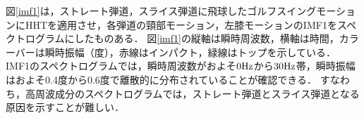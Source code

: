 図\ref{imf1}は，ストレート弾道，スライス弾道に飛球したゴルフスイングモーションにHHTを適用させ，各弾道の頸部モーション，左膝モーションのIMF1をスペクトログラムにしたものある．
図\ref{imf1}の縦軸は瞬時周波数，横軸は時間，カラーバーは瞬時振幅（度），赤線はインパクト，緑線はトップを示している．
IMF1のスペクトログラムでは，瞬時周波数がおよそ$0\rm{Hz}$から$30\rm{Hz}$帯，瞬時振幅はおよそ0.4度から0.6度で離散的に分布されていることが確認できる．
すなわち，高周波成分のスペクトログラムでは，ストレート弾道とスライス弾道となる原因を示すことが難しい．

